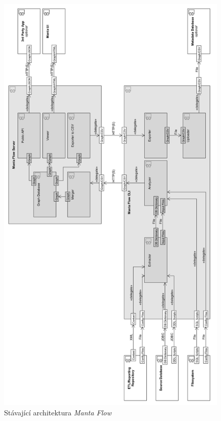 \documentclass[11pt,twoside,a4paper]{book}
\begin{document}
\begin{figure}
\begin{center}
\includegraphics[width=11cm]{figures/flow_comp_vertical}
\caption{Stávající architektura \textit{Manta Flow}}
\label{fig:ana-flow-comp}
\end{center}
\end{figure}
\end{document}
